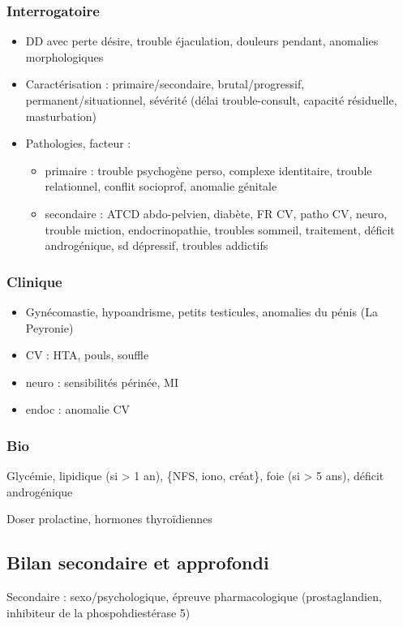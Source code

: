 \documentclass[11pt]{article}
\begin{document}
\subsubsection{Interrogatoire}
\label{sec:org2dcfd0c}
\begin{itemize}
\item DD avec perte désire, trouble éjaculation, douleurs pendant, anomalies morphologiques
\item Caractérisation : primaire/secondaire, brutal/progressif,
permanent/situationnel, sévérité (délai trouble-consult, capacité résiduelle,
masturbation)
\item Pathologies, facteur :
\begin{itemize}
\item primaire : trouble psychogène perso, complexe identitaire, trouble
relationnel, conflit socioprof, anomalie génitale
\item secondaire : ATCD abdo-pelvien, diabète, FR CV, patho CV, neuro, trouble
miction, endocrinopathie, troubles sommeil, traitement, déficit
androgénique, sd dépressif, troubles addictifs
\end{itemize}
\end{itemize}
\subsubsection{Clinique}
\label{sec:org851434b}
\begin{itemize}
\item Gynécomastie, hypoandrisme, petits testicules, anomalies du pénis (La Peyronie)
\item CV : HTA, pouls, souffle
\item neuro : sensibilités périnée, MI
\item endoc : anomalie CV
\end{itemize}
\subsubsection{Bio}
\label{sec:org79e6658}
Glycémie, lipidique (si > 1 an), \{NFS, iono, créat\}, foie (si > 5 ans), déficit
androgénique

Doser prolactine, hormones thyroïdiennes

\subsection{Bilan secondaire et approfondi}
\label{sec:org55381de}
Secondaire : sexo/psychologique, épreuve pharmacologique (prostaglandien,
inhibiteur de la phospohdiestérase 5)
\end{document}
